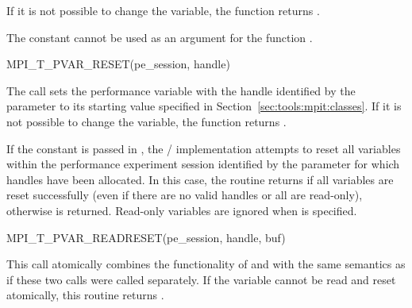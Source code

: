 If it is not possible to change the variable, the function returns
.

The constant  cannot be used as an
argument for the  function .

\begin{funcdef}{MPI\_T\_PVAR\_RESET}{(\mbox{pe\_session}, \mbox{handle})}
\end{funcdef}

The  call sets the performance variable with
the handle identified by the parameter  to its starting
value specified in Section~\ref{sec:tools:mpit:classes}.  If it is not
possible to change the variable, the function returns
.

If the constant  is passed in
, the \MPI/ implementation attempts to reset all variables
within the performance experiment session identified by the parameter  for which
handles have been allocated.  In this case, the routine returns
 if all variables are reset successfully (even if there
are no valid handles or all are read-only), otherwise
 is returned.  Read-only variables are
ignored when  is specified.


\begin{funcdef}{MPI\_T\_PVAR\_READRESET}{(\mbox{pe\_session}, \mbox{handle}, \mbox{buf})}
\end{funcdef}

This call atomically combines the functionality of
 and  with the
same semantics as if these two calls were called separately.  If the
variable cannot be read and reset atomically, this routine returns
.


